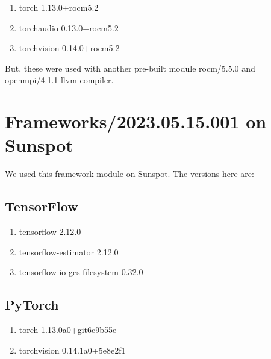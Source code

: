 \documentclass{article}
\begin{document}
\begin{enumerate}
\item torch                     1.13.0+rocm5.2
\item torchaudio                0.13.0+rocm5.2           
\item torchvision               0.14.0+rocm5.2 
\end{enumerate}

But, these were used with another pre-built module rocm/5.5.0 and 
openmpi/4.1.1-llvm compiler.

\section{Frameworks/2023.05.15.001 on Sunspot}
We used this framework module on Sunspot. The versions here are:

\subsection{TensorFlow}

\begin{enumerate}
\item tensorflow                2.12.0
\item tensorflow-estimator      2.12.0
\item tensorflow-io-gcs-filesystem 0.32.0
\end{enumerate}

\subsection{PyTorch}

\begin{enumerate}
\item torch                     1.13.0a0+git6c9b55e
\item torchvision               0.14.1a0+5e8e2f1
\end{enumerate}
\end{document}
